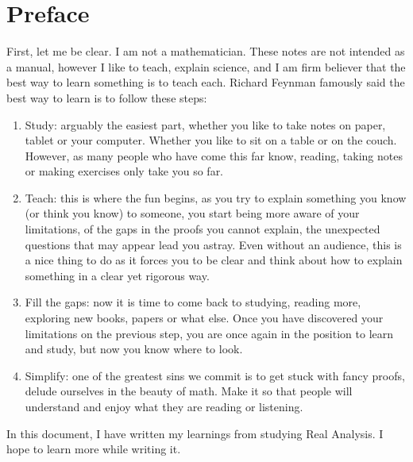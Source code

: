 \chapter{Preface}

First, let me be clear. I am not a mathematician. These notes are not intended as a manual, however I like to teach, explain science, and I am firm believer that the best way to learn something is to teach each. Richard Feynman famously said the best way to learn is to follow these steps:

\begin{enumerate}
    \item Study: arguably the easiest part, whether you like to take notes on paper, tablet or your computer. Whether you like to sit on a table or on the couch. However, as many people who have come this far know, reading, taking notes or making exercises only take you so far.
    \item Teach: this is where the fun begins, as you try to explain something you know (or think you know) to someone, you start being more aware of your limitations, of the gaps in the proofs you cannot explain, the unexpected questions that may appear lead you astray. Even without an audience, this is a nice thing to do as it forces you to be clear and think about how to explain something in a clear yet rigorous way.
    \item Fill the gaps: now it is time to come back to studying, reading more, exploring new books, papers or what else. Once you have discovered your limitations on the previous step, you are once again in the position to learn and study, but now you know where to look.
    \item Simplify: one of the greatest sins we commit is to get stuck with fancy proofs, delude ourselves in the beauty of math. Make it so that people will understand and enjoy what they are reading or listening.
\end{enumerate}

In this document, I have written my learnings from studying Real Analysis. I hope to learn more while writing it.